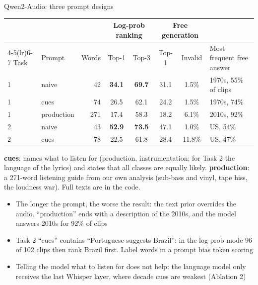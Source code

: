 \documentclass[aspectratio=169,11pt]{beamer}
\newcommand{\best}[1]{\textbf{\alert{#1}}}                       %
\newenvironment{tight}{\begin{itemize}\setlength{\itemsep}{1.5pt}\setlength{\parskip}{0pt}\setlength{\topsep}{0pt}}{\end{itemize}}
\begin{document}
\begin{frame}[t]{Qwen2-Audio: three prompt designs}
  \centering
  {\footnotesize\setlength{\tabcolsep}{4.5pt}
  \begin{tabular}{@{}llrccccl@{}}
    \toprule
    & & & \multicolumn{2}{c}{Log-prob ranking} & \multicolumn{2}{c}{Free generation} & \\ \cmidrule(lr){4-5}\cmidrule(lr){6-7}
    Task & Prompt & Words & Top-1 & Top-3 & Top-1 & Invalid & Most frequent free answer \\ \midrule
    1 & naive      & 42  & \best{34.1} & \best{69.7} & 31.1 & 1.5\% & 1970s, 55\% of clips \\
    1 & cues       & 74  & 26.5 & 62.1 & 24.2 & 1.5\% & 1970s, 74\% \\
    1 & production & 271 & 17.4 & 58.3 & 18.2 & 6.1\% & 2010s, 92\% \\ \midrule
    2 & naive      & 43  & \best{52.9} & \best{73.5} & 47.1 & 1.0\% & US, 54\% \\
    2 & cues       & 78  & 22.5 & 61.8 & 28.4 & 11.8\% & US, 47\% \\
    \bottomrule
  \end{tabular}}
  \vspace{0.1em}

  \raggedright
  {\scriptsize\color{gray}\textbf{cues}: names what to listen for (production, instrumentation; for Task 2 the language of the lyrics) and states that all classes are equally likely.
  \textbf{production}: a 271-word listening guide from our own analysis (sub-bass and vinyl, tape hiss, the loudness war). Full texts are in the code.\par}
  \begin{tight}\footnotesize
    \item \alert{The longer the prompt, the worse the result}: the text prior overrides the audio. ``production'' ends with a description of the 2010s, and the model answers 2010s for 92\% of clips
    \item Task 2 ``cues'' contains ``Portuguese suggests Brazil'': in the log-prob mode 96 of 102 clips then rank Brazil first. Label words in a prompt bias token scoring
    \item Telling the model what to listen for does not help: the language model only receives the last Whisper layer, where decade cues are weakest (Ablation 2)
  \end{tight}
\end{frame}
\end{document}
